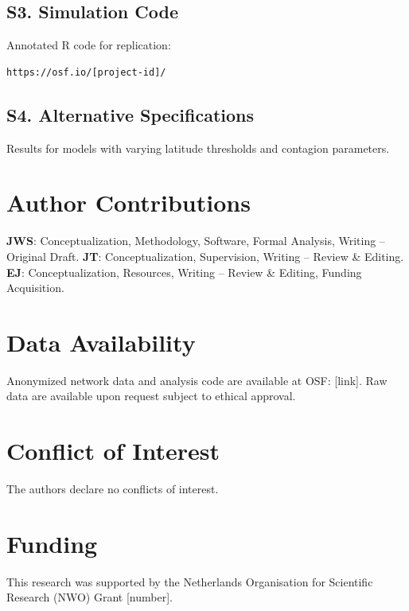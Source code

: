\documentclass[12pt,a4paper]{article}
\begin{document}
\subsection*{S3. Simulation Code}

Annotated R code for replication:
\begin{verbatim}
https://osf.io/[project-id]/
\end{verbatim}

\subsection*{S4. Alternative Specifications}

Results for models with varying latitude thresholds and contagion parameters.


\section*{Author Contributions}

\textbf{JWS}: Conceptualization, Methodology, Software, Formal Analysis, Writing – Original Draft. \textbf{JT}: Conceptualization, Supervision, Writing – Review \& Editing. \textbf{EJ}: Conceptualization, Resources, Writing – Review \& Editing, Funding Acquisition.


\section*{Data Availability}

Anonymized network data and analysis code are available at OSF: [link]. Raw data are available upon request subject to ethical approval.


\section*{Conflict of Interest}

The authors declare no conflicts of interest.


\section*{Funding}

This research was supported by the Netherlands Organisation for Scientific Research (NWO) Grant [number].
\end{document}
